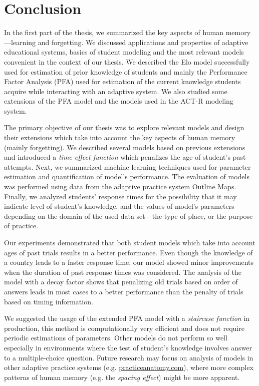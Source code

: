 \chapter{Conclusion}

In the first part of the thesis, we summarized the key aspects of human memory---learning and forgetting. We discussed applications and properties of adaptive educational systems, basics of student modeling and the most relevant models convenient in the context of our thesis. We described the Elo model successfully used for estimation of prior knowledge of students and mainly the Performance Factor Analysis (PFA) used for estimation of the current knowledge students acquire while interacting with an adaptive system. We also studied some extensions of the PFA model and the models used in the ACT-R modeling system.

The primary objective of our thesis was to explore relevant models and design their extensions which take into account the key aspects of human memory (mainly forgetting). We described several models based on previous extensions and introduced a \textit{time effect function} which penalizes the age of student's past attempts. Next, we summarized machine learning techniques used for parameter estimation and quantification of model's performance. The evaluation of models was performed using data from the adaptive practice system Outline Maps. Finally, we analyzed students' response times for the possibility that it may indicate level of student's knowledge, and the values of model's parameters depending on the domain of the used data set---the type of place, or the purpose of practice.

Our experiments demonstrated that both student models which take into account ages of past trials results in a better performance. Even though the knowledge of a country leads to a faster response time, our model showed minor improvements when the duration of past response times was considered. The analysis of the model with a decay factor shows that penalizing old trials based on order of answers leads in most cases to a better performance than the penalty of trials based on timing information.

We suggested the usage of the extended PFA model with a \textit{staircase function} in production, this method is computationally very efficient and does not require periodic estimations of parameters. Other models do not perform so well especially in environments where the test of student's knowledge involves answer to a multiple-choice question. Future research may focus on analysis of models in other adaptive practice systems (e.g. \url{practiceanatomy.com}), where more complex patterns of human memory (e.g. the \textit{spacing effect}) might be more apparent.
